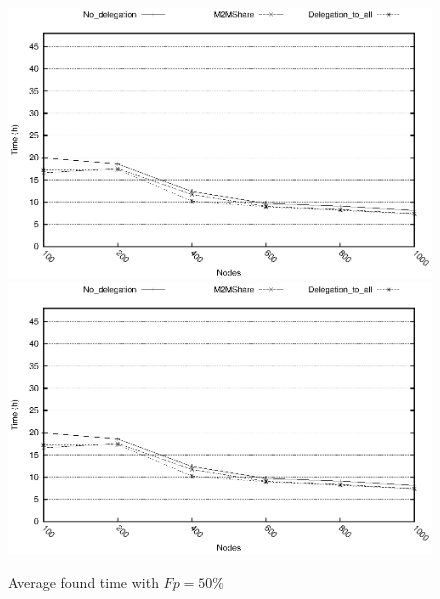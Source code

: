 \begin{figure}[htbp]
\centering%
\subfigure%
{\includegraphics{grafici/tempiVF_Fp50.eps}}\qquad\qquad
\subfigure%
{\includegraphics{grafici/tempiVF_Fp50_zoom.eps}}
\caption{Average found time with $Fp = 50\%$\label{graficiTempiVF_Fp50}}
\end{figure}


\newpage
